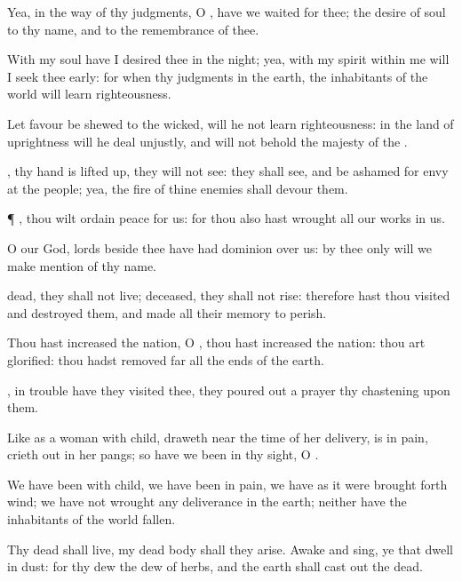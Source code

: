 {Yea, in the
way of thy
judgments, O
{}, have we
waited for thee; the
desire of
{}
soul
{} to thy
name, and to the
remembrance of thee.

With my
soul have I
desired thee in the
night; yea, with my
spirit
within me will I seek thee
early: for when thy
judgments
{} in the
earth, the
inhabitants of the
world will
learn
righteousness.

Let favour be
shewed to the
wicked,
{} will he
not
learn
righteousness: in the
land of
uprightness will he deal
unjustly, and will
not
behold the
majesty of the
{}.

,
{} thy
hand is lifted
up, they will not
see:
{} they shall
see, and be
ashamed for
{}
envy at the
people; yea, the
fire of thine
enemies shall
devour them.


\par }{\PP {}¶
{}, thou wilt
ordain
peace for us: for thou also hast
wrought all our
works in us.

O
{} our
God,
{}
lords
beside thee have had
dominion over us:
{} by thee only will we make
mention of thy
name.

dead, they shall not
live;
{}
deceased, they shall not
rise: therefore hast thou
visited and
destroyed them, and made all their
memory to
perish.

Thou hast
increased the
nation, O
{}, thou hast
increased the
nation: thou art
glorified: thou hadst removed
{}
far
{} all the
ends of the
earth.

, in
trouble have they
visited thee, they poured
out a
prayer
{} thy
chastening
{} upon them.

Like as a woman with
child,
{} draweth
near the time of her
delivery, is in
pain,
{} crieth
out in her
pangs; so have we been in thy
sight, O
{}.

We have been with
child, we have been in
pain, we have as it
were brought
forth
wind; we have not
wrought any
deliverance in the
earth;
neither have the
inhabitants of the
world
fallen.

Thy
dead
{} shall
live,
{} my dead
body shall they
arise.
Awake and
sing, ye that
dwell in
dust: for thy
dew
{} the
dew of
herbs, and the
earth shall cast
out the
dead.


}
